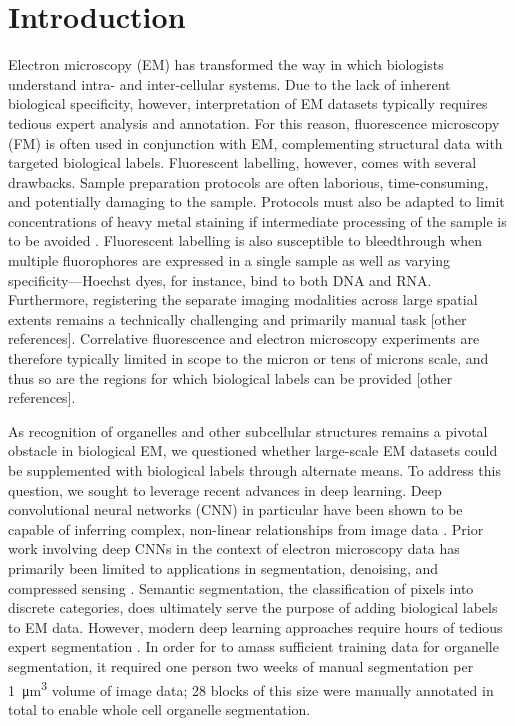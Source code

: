\section{Introduction}
\label{sec:4.1_intro}



Electron microscopy (EM) has transformed the way in which biologists understand intra- and inter-cellular systems. Due to the lack of inherent biological specificity, however, interpretation of EM datasets typically requires tedious expert analysis and annotation. For this reason, fluorescence microscopy (FM) is often used in conjunction with EM, complementing structural data with targeted biological labels. Fluorescent labelling, however, comes with several drawbacks. Sample preparation protocols are often laborious, time-consuming, and potentially damaging to the sample. Protocols must also be adapted to limit concentrations of heavy metal staining if intermediate processing of the sample is to be avoided \cite{kuipers2015scanning,lane2021optimization}. Fluorescent labelling is also susceptible to bleedthrough when multiple fluorophores are expressed in a single sample as well as varying specificity---Hoechst dyes, for instance, bind to both DNA and RNA. Furthermore, registering the separate imaging modalities across large spatial extents remains a technically challenging and primarily manual task \cite{russell20173d} [other references]. Correlative fluorescence and electron microscopy experiments are therefore typically limited in scope to the micron or tens of microns scale, and thus so are the regions for which biological labels can be provided \cite{russell20173d} [other references].

As recognition of organelles and other subcellular structures remains a pivotal obstacle in biological EM, we questioned whether large-scale EM datasets could be supplemented with biological labels through alternate means. To address this question, we sought to leverage recent advances in deep learning. Deep convolutional neural networks (CNN) in particular have been shown to be capable of inferring complex, non-linear relationships from image data \cite{he2016deep,januszewski2018high}. Prior work involving deep CNNs in the context of electron microscopy data has primarily been limited to applications in segmentation, denoising, and compressed sensing \cite{ede2021deep}. Semantic segmentation, the classification of pixels into discrete categories, does ultimately serve the purpose of adding biological labels to EM data. However, modern deep learning approaches require hours of tedious expert segmentation \cite{huang2014identifying,heinrich2018synaptic,liu2020automatic,spiers2021deep}. In order for \textcite{heinrich2020automatic} to amass sufficient training data for organelle segmentation, it required one person two weeks of manual segmentation per \SI{1}{\micro\meter^3} volume of image data; 28 blocks of this size were manually annotated in total to enable whole cell organelle segmentation.

